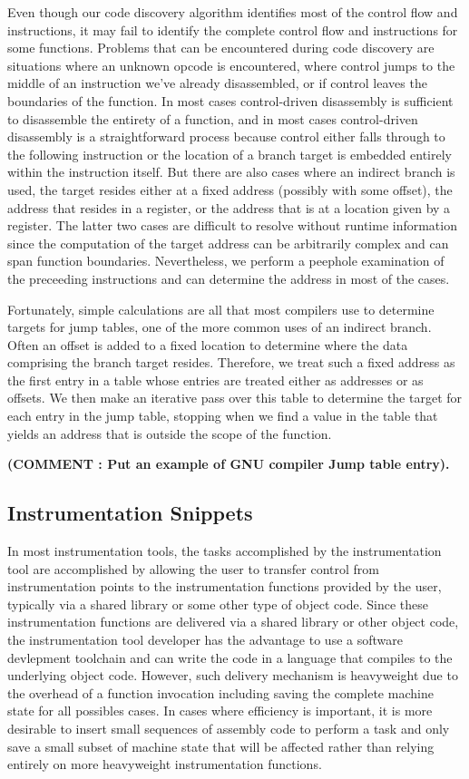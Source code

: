 Even though our code discovery algorithm identifies most of the control flow and instructions, it may fail to 
identify the complete control flow and instructions for some functions.  Problems that can be encountered during code discovery
are situations where an unknown opcode is encountered, where control jumps to the
middle of an instruction we've already disassembled, or if control leaves the boundaries of the function. In most
cases control-driven disassembly is sufficient to disassemble the entirety of a function, and in most cases control-driven
disassembly is a straightforward process because control either falls through to the following instruction 
or the location of a branch target is embedded entirely within the instruction itself. But there are also cases
where an indirect branch is used, the target resides either at a fixed address (possibly with some offset),
the address that resides in a register, or the address that is at a location given by a register. The latter two cases are difficult to resolve
without runtime information since the computation of the target address can be arbitrarily complex and can span function
boundaries. Nevertheless, we perform a peephole examination of the preceeding instructions and can determine 
the address in most of the cases.

Fortunately, simple calculations are all that most compilers use to determine targets for jump tables, one of the more common
uses of an indirect branch. Often an offset is added to a fixed location to determine where the data comprising the branch target
resides. Therefore, we treat such a fixed address as the first entry in a table whose entries are treated either as addresses or as offsets.
We then make an iterative pass over this table to determine the target for each entry in the jump table, stopping when we find a value in the
table that yields an address that is outside the scope of the function.

\textbf{(COMMENT : Put an example of GNU compiler Jump table entry).}

\subsection{Instrumentation Snippets}

In most instrumentation tools, the tasks accomplished by the instrumentation tool are accomplished by allowing the user
to transfer control from instrumentation points to the instrumentation functions provided by the user, typically
via a shared library or some other type of object code. Since these instrumentation functions are delivered via a shared library or other
object code, the instrumentation tool developer has the advantage to use a software devlepment toolchain and can
write the code in a language that compiles to the underlying object code. However, such delivery mechanism is heavyweight due to 
the overhead of a function invocation including saving the complete machine state for all possibles cases. In cases where
efficiency is important, it is more desirable to insert small sequences of assembly code to perform a task and only
save a small subset of machine state that will be affected rather than relying entirely on more heavyweight instrumentation functions.

